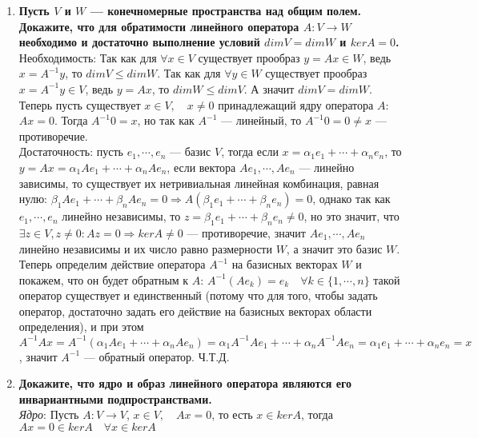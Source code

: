 \documentclass[12pt]{article} %
\begin{document}
\begin{enumerate}
    \item \textbf{Пусть $V$ и $W$ --- конечномерные пространства над общим полем. Докажите, что для обратимости линейного оператора $A: V \rightarrow W$ необходимо и достаточно выполнение условий $dimV = dimW$ и $kerA = 0$.}\\

    Необходимость: Так как для $\forall x \in V$ существует прообраз $y = Ax \in W$, ведь $x = A^{-1}y$, то $dimV \leqslant dimW$. Так как для $\forall y \in W$ существует прообраз $x = A^{-1}y \in V$, ведь $y = Ax$, то $dimW \leqslant dimV$. А значит $dimV = dimW$. Теперь пусть существует $x \in V, \quad x \neq 0$ принадлежащий ядру оператора $A$: $Ax = 0$. Тогда $A^{-1}0 = x$, но так как $A^{-1}$ --- линейный, то $A^{-1}0 = 0 \neq x$ --- противоречие.\\

    Достаточность: пусть $e_1, \cdots, e_n$ --- базис $V$, тогда если $x = \alpha_1 e_1 + \cdots + \alpha_n e_n$, то $y = Ax = \alpha_1 Ae_1 + \cdots + \alpha_n Ae_n$, если вектора $Ae_1, \cdots, Ae_n$ --- линейно зависимы, то существует их нетривиальная линейная комбинация, равная нулю: $\beta_1Ae_1 + \cdots + \beta_nAe_n = 0 \Rightarrow A(\beta_1 e_1 + \cdots + \beta_n e_n) = 0$, однако так как $e_1, \cdots, e_n$ линейно независимы, то $z = \beta_1 e_1 + \cdots + \beta_n e_n \neq 0$, но это значит, что $\exists z \in V, z \neq 0 : Az = 0 \Rightarrow kerA \neq 0$ --- противоречие, значит $Ae_1, \cdots, Ae_n$ линейно независимы и их число равно размерности $W$, а значит это базис $W$.\\
    Теперь определим действие оператора $A^{-1}$ на базисных векторах $W$ и покажем, что он будет обратным к $A$:
    $A^{-1}(Ae_k) = e_k \quad \forall k \in \{1, \cdots, n\}$ такой оператор существует и единственный (потому что для того, чтобы задать оператор, достаточно задать его действие на базисных векторах области определения), и при этом $A^{-1}Ax = A^{-1}(\alpha_1 Ae_1 + \cdots + \alpha_n Ae_n) = \alpha_1 A^{-1} Ae_1 + \cdots + \alpha_n A^{-1} Ae_n = \alpha_1 e_1 + \cdots + \alpha_n e_n = x$, значит $A^{-1}$ --- обратный оператор. Ч.Т.Д.
    \item \textbf{Докажите, что ядро и образ линейного оператора являются его инвариантными подпространствами.}\\

    \textit{Ядро}: Пусть $A: V \rightarrow V$, $x \in  V,\quad Ax = 0$, то есть $x \in kerA$, тогда $Ax = 0 \in kerA \quad \forall x \in kerA$\\


\end{enumerate}
\end{document}
